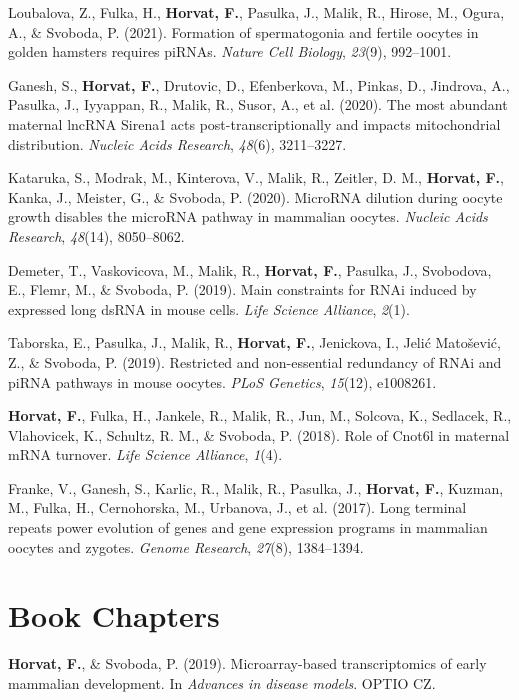 \documentclass[11pt,a4paper,]{awesome-cv}
\begin{document}
\leavevmode{}%
Loubalova, Z., Fulka, H., \textbf{Horvat, F.}, Pasulka, J., Malik, R.,
Hirose, M., Ogura, A., \& Svoboda, P. (2021). Formation of spermatogonia
and fertile oocytes in golden hamsters requires piRNAs. \emph{Nature
Cell Biology}, \emph{23}(9), 992--1001.

\leavevmode{}%
Ganesh, S., \textbf{Horvat, F.}, Drutovic, D., Efenberkova, M., Pinkas,
D., Jindrova, A., Pasulka, J., Iyyappan, R., Malik, R., Susor, A., et
al. (2020). The most abundant maternal lncRNA Sirena1 acts
post-transcriptionally and impacts mitochondrial distribution.
\emph{Nucleic Acids Research}, \emph{48}(6), 3211--3227.

\leavevmode{}%
Kataruka, S., Modrak, M., Kinterova, V., Malik, R., Zeitler, D. M.,
\textbf{Horvat, F.}, Kanka, J., Meister, G., \& Svoboda, P. (2020).
MicroRNA dilution during oocyte growth disables the microRNA pathway in
mammalian oocytes. \emph{Nucleic Acids Research}, \emph{48}(14),
8050--8062.

\leavevmode{}%
Demeter, T., Vaskovicova, M., Malik, R., \textbf{Horvat, F.}, Pasulka,
J., Svobodova, E., Flemr, M., \& Svoboda, P. (2019). Main constraints
for RNAi induced by expressed long dsRNA in mouse cells. \emph{Life
Science Alliance}, \emph{2}(1).

\leavevmode{}%
Taborska, E., Pasulka, J., Malik, R., \textbf{Horvat, F.}, Jenickova,
I., Jelić Matošević, Z., \& Svoboda, P. (2019). Restricted and
non-essential redundancy of RNAi and piRNA pathways in mouse oocytes.
\emph{PLoS Genetics}, \emph{15}(12), e1008261.

\leavevmode{}%
\textbf{Horvat, F.}, Fulka, H., Jankele, R., Malik, R., Jun, M.,
Solcova, K., Sedlacek, R., Vlahovicek, K., Schultz, R. M., \& Svoboda,
P. (2018). Role of Cnot6l in maternal mRNA turnover. \emph{Life Science
Alliance}, \emph{1}(4).

\leavevmode{}%
Franke, V., Ganesh, S., Karlic, R., Malik, R., Pasulka, J.,
\textbf{Horvat, F.}, Kuzman, M., Fulka, H., Cernohorska, M., Urbanova,
J., et al. (2017). Long terminal repeats power evolution of genes and
gene expression programs in mammalian oocytes and zygotes. \emph{Genome
Research}, \emph{27}(8), 1384--1394.

\hypertarget{book-chapters}{%
\section{Book Chapters}\label{book-chapters}}

\hypertarget{bibliography}{}
\leavevmode{}%
\textbf{Horvat, F.}, \& Svoboda, P. (2019). Microarray-based
transcriptomics of early mammalian development. In \emph{Advances in
disease models}. OPTIO CZ.
\end{document}
